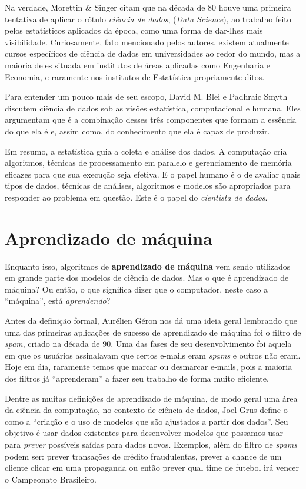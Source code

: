 \documentclass[12pt,brazil]{article}
\newcommand{\defi}[1]{\textbf{#1}}
\newcommand{\eng}[1]{\emph{#1}}
\begin{document}
Na verdade, Morettin \& Singer \citep{apostila} citam que na década de 80 houve uma primeira tentativa de aplicar o rótulo \emph{ciência de dados}, (\emph{Data Science}), ao trabalho feito pelos estatísticos aplicados da época, como uma forma de dar-lhes mais visibilidade. Curiosamente, fato mencionado pelos autores, existem atualmente cursos específicos de ciência de dados em universidades ao redor do mundo, mas a maioria deles situada em institutos de áreas aplicadas como Engenharia e Economia, e raramente nos institutos de Estatística propriamente ditos.

Para entender um pouco mais de seu escopo, David M. Blei e Padhraic Smyth \citep{blei} discutem ciência de dados sob as visões estatística, computacional e humana. Eles argumentam que é a combinação desses três componentes que formam a essência do que ela é e, assim como, do conhecimento que ela é capaz de produzir.

Em resumo, a estatística guia a coleta e análise dos dados. A computação cria algoritmos, técnicas de processamento em paralelo e gerenciamento de memória eficazes para que sua execução seja efetiva. E o papel humano é o de avaliar quais tipos de dados, técnicas de análises, algoritmos e modelos são apropriados para responder ao problema em questão. Este é o papel do \emph{cientista de dados}.

\section{Aprendizado de máquina}

Enquanto isso, algoritmos de \defi{aprendizado de máquina} vem sendo utilizados em grande parte dos modelos de ciência de dados. Mas o que é aprendizado de máquina? Ou então, o que significa dizer que o computador, neste caso a ``máquina'', está \emph{aprendendo}?

Antes da definição formal, Aurélien Géron \citep{hands} nos dá uma ideia geral lembrando que uma das primeiras aplicações de sucesso de aprendizado de máquina foi o filtro de \eng{spam}, criado na década de 90. Uma das fases de seu desenvolvimento foi aquela em que os usuários assinalavam que certos e-mails eram \eng{spams} e outros não eram. Hoje em dia, raramente temos que marcar ou desmarcar e-mails, pois a maioria dos filtros já ``aprenderam'' a fazer seu trabalho de forma muito eficiente.

Dentre as muitas definições de aprendizado de máquina, de modo geral uma área da ciência da computação, no contexto de ciência de dados, Joel Grus \citep{data} define-o como a ``criação e o uso de modelos que são ajustados a partir dos dados''. Seu objetivo é usar dados existentes para desenvolver modelos que possamos usar para \emph{prever} possíveis saídas para dados novos. Exemplos, além do filtro de \eng{spams} podem ser: prever transações de crédito fraudulentas, prever a chance de um cliente clicar em uma propaganda ou então prever qual time de futebol irá vencer o Campeonato Brasileiro.
\end{document}
